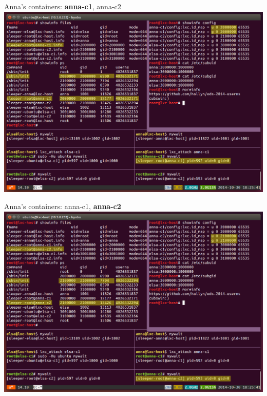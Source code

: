 \documentclass{beamer}
\begin{document}
\begin{frame}
Anna's containers: \textbf{anna-c1}, anna-c2
\includegraphics[width=\textwidth]{screen-anna-c1.png}
\end{frame}

\begin{frame}
Anna's containers: anna-c1, \textbf{anna-c2}
\includegraphics[width=\textwidth]{screen-anna-c2.png}
\end{frame}
\end{document}
